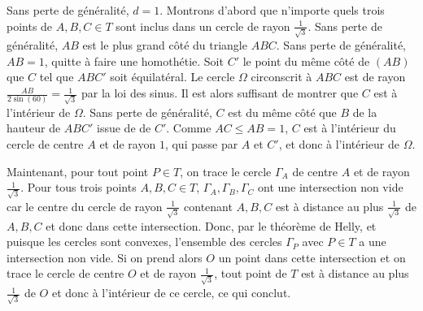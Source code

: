 Sans perte de généralité, $d = 1$. Montrons d'abord que n'importe quels trois points de $A, B, C \in T$ sont inclus dans un cercle de rayon $\frac 1{\sqrt3}$. Sans perte de généralité, $AB$ est le plus grand côté du triangle $ABC$. Sans perte de généralité, $AB=1$, quitte à faire une homothétie. Soit $C'$ le point du même côté de $(AB)$ que $C$ tel que $ABC'$ soit équilatéral. Le cercle $\Omega$ circonscrit à $ABC$ est de rayon $\frac{AB}{2\sin(60)}=\frac 1{\sqrt3}$ par la loi des sinus. Il est alors suffisant de montrer que $C$ est à l'intérieur de $\Omega$. Sans perte de généralité, $C$ est du même côté que $B$ de la hauteur de $ABC'$ issue de de $C'$. Comme $AC\leqslant AB=1$, $C$ est à l'intérieur du cercle de centre $A$ et de rayon $1$, qui passe par $A$ et $ C'$, et donc à l'intérieur de $\Omega$.

Maintenant, pour tout point $P\in T$, on trace le cercle $\Gamma_A$ de centre $A$ et de rayon $\frac 1{\sqrt 3}$. Pour tous trois points $A, B, C \in T$, $\Gamma_A, \Gamma_B, \Gamma_C$ ont une intersection non vide car le centre du cercle de rayon $\frac 1{\sqrt 3}$ contenant $A, B, C$ est à distance au plus $\frac 1{\sqrt 3}$ de $A, B, C$ et donc dans cette intersection. Donc, par le théorème de Helly, et puisque les cercles sont convexes, l'ensemble des cercles $\Gamma_P$ avec $P\in T$ a une intersection non vide. Si on prend alors $O$ un point dans cette intersection et on trace le cercle de centre $O$ et de rayon $\frac 1{\sqrt 3}$, tout point de $T$ est à distance au plus $\frac 1{\sqrt 3}$ de $O$ et donc à l'intérieur de ce cercle, ce qui conclut.